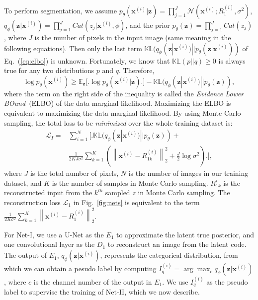 \documentclass[letterpaper, 10 pt, journal, twoside]{ieeetran}
\begin{document}
To perform  segmentation, we assume $p_{\theta}(\mathbf{x}^{(i)} | \mathbf{z}) = \prod_{j=1}^J \mathcal{N} (\mathbf{x}^{(i)}; R_1^{(i)}, \sigma^2)$, $q_{\phi}(\mathbf{z}|\mathbf{x}^{(i)}) = \prod_{j=1}^J Cat(z_j|\mathbf{x}^{(i)}, \phi)$, and the prior $p_{\theta}(\mathbf{z}) = \prod_{j=1}^J Cat(z_j)$, where $J$ is the number of pixels in the input image (same meaning in the following equations). Then only the last term $\mathbb{KL}(q_{\phi}(\mathbf{z}|\mathbf{x}^{(i)}) || p_{\theta}(\mathbf{z}|\mathbf{x}^{(i)})) $ of Eq.~(\ref{eq:elbo}) is unknown. Fortunately, we know that $\mathbb{KL}(p||q)\geq 0$ is always true for any two distributions $p$ and $q$. Therefore, 
\begin{equation}
    \label{eq:lower_bound}
    \log p_{\theta}(\mathbf{x}^{(i)})\geq \mathbb{E}_{\mathbf{z}} \Bigg[ \Bigg.
    \log p_{\theta} (\mathbf{x}^{(i)}|\mathbf{z})\Bigg. \Bigg] - \mathbb{KL}(q_{\phi}(\mathbf{z}|\mathbf{x}^{(i)}) || p_{\theta}(\mathbf{z})),
\end{equation}
where the term on the right side of the inequality is called the \textit{Evidence Lower BOund}~(ELBO) of the data marginal likelihood. Maximizing the ELBO is equivalent to maximizing the data marginal likelihood. By using Monte Carlo sampling, the total loss to be \textit{minimized} over the whole training dataset is:
\begin{equation}
    \label{eq:loss_1}
    \begin{aligned}
        \mathcal{L}_{I} = &\sum\nolimits_{i=1}^N  \Bigg[ \Bigg. \mathbb{KL}(q_{\phi}(\mathbf{z}|\mathbf{x}^{(i)}) || p_{\theta}(\mathbf{z})) +\\ &\frac{1}{2KJ\sigma^2}\sum\nolimits_{k=1}^K \left ( \left \| \mathbf{x}^{(i)} - R_{1k}^{(i)} \right \|_2^2 + \frac{J}{2} \log \sigma^2 \right ) \Bigg. \Bigg],
    \end{aligned}
\end{equation}
where $J$ is the total number of pixels, $N$ is the number of images in our training dataset, and $K$ is the number of samples in Monte Carlo sampling. $R_{1k}^{i}$ is the reconstructed input from the $k^{th}$ sampled $z$ in Monte Carlo sampling. The reconstruction loss $\mathcal{L}_1$ in Fig.~\ref{fig:nets} is equivalent to the term  $\frac{1}{2K\sigma^2}\sum\nolimits_{k=1}^K \left \| \mathbf{x}^{(i)} - R_1^{(i)} \right \|_2^2$.

For Net-I, we use a U-Net \cite{ronneberger2015u} as the $E_1$ to approximate the latent true posterior, and one convolutional layer as the $D_1$ to reconstruct an image from the latent code. The output of  $E_1$, $q_{\phi}(\mathbf{z}|\mathbf{x}^{(i)})$, represents the categorical distribution, from which we can obtain a pesudo label by computing $I_q^{(i)} = \arg \max_{c} q_{\phi}(\mathbf{z}|\mathbf{x}^{(i)})$, where $c$ is the channel number of the output in $E_1$. We use $I_q^{(i)}$ as the pseudo label to supervise the training of  Net-II, which we now describe.
\end{document}
